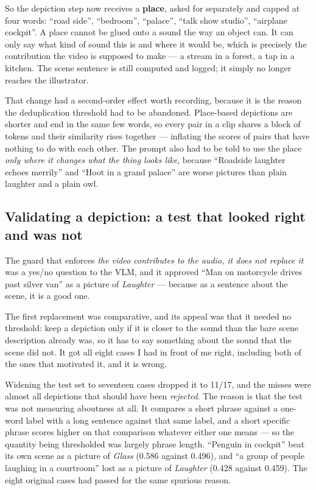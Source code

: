 \documentclass[11pt,a4paper]{article}
\begin{document}
So the depiction step now receives a \textbf{place}, asked for separately and capped at four words:
``road side'', ``bedroom'', ``palace'', ``talk show studio'', ``airplane cockpit''. A place cannot be
glued onto a sound the way an object can. It can only say what kind of sound this is and where it
would be, which is precisely the contribution the video is supposed to make --- a stream in a forest,
a tap in a kitchen. The scene sentence is still computed and logged; it simply no longer reaches the
illustrator.

That change had a second-order effect worth recording, because it is the reason the deduplication
threshold had to be abandoned. Place-based depictions are shorter and end in the same few words, so
every pair in a clip shares a block of tokens and their similarity rises together --- inflating the
scores of pairs that have nothing to do with each other. The prompt also had to be told to use the
place \emph{only where it changes what the thing looks like}, because ``Roadside laughter echoes
merrily'' and ``Hoot in a grand palace'' are worse pictures than plain laughter and a plain owl.

\subsection{Validating a depiction: a test that looked right and was not}\label{sec:contribute}
The guard that enforces \emph{the video contributes to the audio, it does not replace it} was a
yes/no question to the VLM, and it approved ``Man on motorcycle drives past silver van'' as a picture
of \emph{Laughter} --- because as a sentence about the scene, it is a good one.

The first replacement was comparative, and its appeal was that it needed no threshold: keep a
depiction only if it is closer to the sound than the bare scene description already was, so it has to
say something about the sound that the scene did not. It got all eight cases I had in front of me
right, including both of the ones that motivated it, and it is wrong.

Widening the test set to seventeen cases dropped it to 11/17, and the misses were almost all
depictions that should have been \emph{rejected}. The reason is that the test was not measuring
aboutness at all. It compares a short phrase against a one-word label with a long sentence against
that same label, and a short specific phrase scores higher on that comparison whatever either one
means --- so the quantity being thresholded was largely phrase length. ``Penguin in cockpit'' beat
its own scene as a picture of \emph{Glass} (0.586 against 0.496), and ``a group of people laughing in
a courtroom'' lost as a picture of \emph{Laughter} (0.428 against 0.459). The eight original cases
had passed for the same spurious reason.
\end{document}
